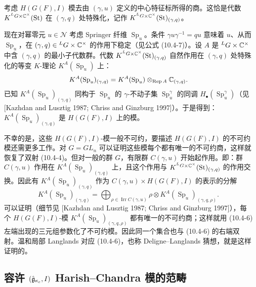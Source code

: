 考虑 $H(G(F),I)$ 模去由 $(\gamma,u)$ 定义的中心特征标所得的商。这恰是代数 $K^{{}^L G\times\mathbb{C}^\times}(\mathrm{St})$ 在 $(\gamma,q)$ 处特殊化，记作 $K^{{}^L G\times\mathbb{C}^\times}(\mathrm{St})_{(\gamma,q)}$。

现在对幂零元 $u\in\mathcal{N}$ 考虑 Springer 纤维 $\operatorname{Sp}_u$。条件 $\gamma u\gamma^{-1}=qu$ 意味着 $u$、从而 $\operatorname{Sp}_u$，在 $(\gamma,q)\in{}^L G\times\mathbb{C}^\times$ 的作用下稳定（见公式 (10.4-7)）。设 $A$ 是 ${}^L G\times\mathbb{C}^\times$ 中含 $(\gamma,q)$ 的最小子代数群。代数 $K^{{}^L G\times\mathbb{C}^\times}(\mathrm{St})_{(\gamma,q)}$ 自然作用在 $(\gamma,q)$ 处特殊化的等变 $K$-理论 $K^A(\operatorname{Sp}_u)$ 上：
\[
    K^A(\operatorname{Sp}_u)_{(\gamma,q)}=K^A(\operatorname{Sp}_u)\otimes_{\operatorname{Rep} A}\mathbb{C}_{(\gamma,q)}.
\]
已知 $K^A(\operatorname{Sp}_u)_{(\gamma,q)}$ 同构于 $\operatorname{Sp}_u$ 的 $\gamma$-不动子集 $\operatorname{Sp}_u^\gamma$ 的同调 $H_\bullet(\operatorname{Sp}_u^\gamma)$（见 [Kazhdan and Lusztig 1987; Chriss and Ginzburg 1997]）。于是得到：$K^A(\operatorname{Sp}_u)_{(\gamma,q)}$ 是 $H(G(F),I)$ 上的模。

不幸的是，这些 $H(G(F),I)$-模一般不可约，要描述 $H(G(F),I)$ 的不可约模还需更多工作。对 $G=GL_n$ 可以证明这些模每个都有唯一的不可约商，这样就恢复了双射 (10.4-4)。但对一般的群 $G$，有限群 $C(\gamma,u)$ 开始起作用。即：群 $C(\gamma,u)$ 作用在 $K^A(\operatorname{Sp}_u)_{(\gamma,q)}$ 上，且这个作用与 $K^{{}^L G\times\mathbb{C}^\times}(\mathrm{St})_{(\gamma,q)}$ 的作用交换。因此有 $K^A(\operatorname{Sp}_u)_{(\gamma,q)}$ 作为 $C(\gamma,u)\times H(G(F),I)$ 的表示的分解
\[
    K^A(\operatorname{Sp}_u)_{(\gamma,q)}
    =\bigoplus_{\rho\in\operatorname{Irr}C(\gamma,u)}
    \rho\otimes K^A(\operatorname{Sp}_u)_{(\gamma,q,\rho)}.
\]
可以证明（细节见 [Kazhdan and Lusztig 1987; Chriss and Ginzburg 1997]），每个 $H(G(F),I)$-模 $K^A(\operatorname{Sp}_u)_{(\gamma,q,\rho)}$ 都有唯一的不可约商；这样就用 (10.4-6) 左端出现的三元组参数化了不可约模。因此同一个集合也与 (10.4-6) 的右端双射。温和局部 Langlands 对应 (10.4-6)，也称 Deligne--Langlands 猜想，就是这样证明的。

\subsection{容许 \texorpdfstring{$(\hat{\mathfrak{g}}_{\kappa_c},I)$}{(\hat g_kc,I)} Harish--Chandra 模的范畴}

